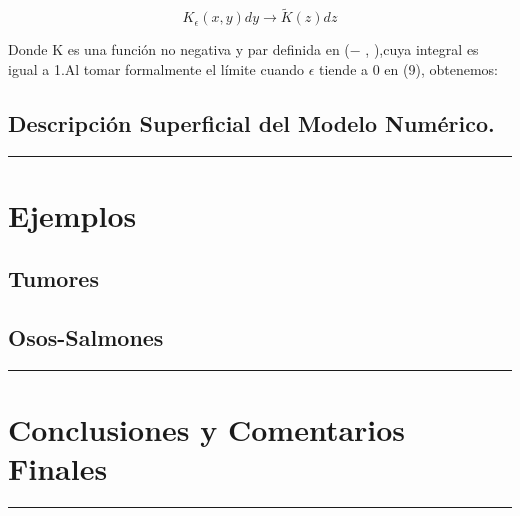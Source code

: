 \documentclass[letterpaper]{article}
\begin{document}
{        \begin{equation}
            K_{\epsilon}(x,y)dy\longrightarrow \widetilde{K}(z)dz

        \end{equation}

        \normalsize{Donde K es una función no negativa y par definida en (− \infty, \infty),cuya integral es igual a 1.Al tomar formalmente el límite cuando $\epsilon$ tiende a 0 en (9), obtenemos:}\\


        
        \subsection{Descripción Superficial del Modelo Numérico.}
          


    }

    \vspace{0.2cm}
        \rule{150mm}{0.5mm} %
    \vspace{0.2cm}

    \section{Ejemplos}{

        \subsection{Tumores}

        \subsection{Osos-Salmones}
    
    }

    \vspace{0.2cm}
        \rule{150mm}{0.5mm} %
    \vspace{0.2cm}

    \section{Conclusiones y Comentarios Finales}

    \vspace{0.2cm}
        \rule{150mm}{0.5mm} %
    \vspace{0.2cm}
\end{document}
